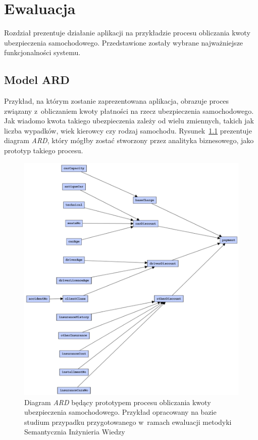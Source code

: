 \chapter{Ewaluacja}
\label{cha:ewaluacja}
Rozdział prezentuje działanie aplikacji na przykładzie procesu obliczania kwoty ubezpieczenia samochodowego. Przedstawione zostały wybrane najważniejsze funkcjonalności systemu.

\section{Model ARD}
\label{sec:modelARD}
Przykład, na którym zostanie zaprezentowana aplikacja, obrazuje proces związany z~obliczaniem kwoty płatności na rzecz ubezpieczenia samochodowego. Jak wiadomo kwota takiego ubezpieczenia zależy od wielu zmiennych, takich jak liczba wypadków, wiek kierowcy czy rodzaj samochodu. Rysunek~\ref{fig:ardInsuranceExample} prezentuje diagram \emph{ARD}, który mógłby zostać stworzony przez analityka biznesowego, jako prototyp takiego procesu.
\begin{figure}
    \centering
    \includegraphics[width=\textwidth]{./assets/ardInsuranceExample.pdf}
    \caption{Diagram \emph{ARD} będący prototypem procesu obliczania kwoty ubezpieczenia samochodowego. Przykład opracowany na bazie studium przypadku przygotowanego w~ramach ewaluacji metodyki Semantycznia Inżynieria Wiedzy~\cite{gjn2011hab}}
    \label{fig:ardInsuranceExample}
\end{figure} 
